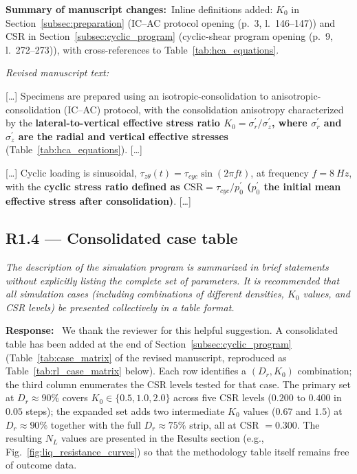 \documentclass[11pt,a4paper]{article}
\newenvironment{rcomment}
  {\begin{leftbar}\color{black!75}\itshape}
  {\end{leftbar}\vspace{0.3em}}
\newcommand{\response}{\par\noindent\textbf{Response:}\ \ignorespaces}
\newcommand{\changed}[1]{\par\noindent\textbf{Summary of manuscript changes:}\ #1\par}
\newenvironment{revtext}
  {\par\vspace{0.2em}\noindent\textit{Revised manuscript text:}\par
   \begingroup\color{black}\begin{leftbar}\small}
  {\end{leftbar}\endgroup\vspace{0.3em}}
\newcommand{\manref}[1]{(#1)}                  %
\newcommand{\Kzero}{\ensuremath{K_0}}
\begin{document}
\changed{Inline definitions added: $\Kzero$ in
Section~\ref{subsec:preparation} (IC--AC protocol opening
\manref{p.~3, l.~146--147}) and $\mathrm{CSR}$ in
Section~\ref{subsec:cyclic_program} (cyclic-shear program opening
\manref{p.~9, l.~272--273}), with cross-references to
Table~\ref{tab:hca_equations}.}

\begin{revtext}
[\ldots] Specimens are prepared using an isotropic-consolidation to
anisotropic-consolidation (IC--AC) protocol, with the consolidation
anisotropy characterized by the \textbf{lateral-to-vertical effective
stress ratio $\Kzero = \sigma_r^{\prime}/\sigma_z^{\prime}$, where
$\sigma_r^{\prime}$ and $\sigma_z^{\prime}$ are the radial and
vertical effective stresses} (Table~\ref{tab:hca_equations}). [\ldots]
\medskip

[\ldots] Cyclic loading is sinusoidal,
$\tau_{z\theta}(t) = \tau_{cyc}\sin(2\pi f t)$, at frequency
$f = \SI{8}{Hz}$, with the \textbf{cyclic stress ratio defined as
$\mathrm{CSR} = \tau_{cyc}/p_0^{\prime}$ ($p_0^{\prime}$ the initial
mean effective stress after consolidation)}. [\ldots]
\end{revtext}

\subsection*{R1.4 --- Consolidated case table}

\begin{rcomment}
The description of the simulation program is summarized in brief statements
without explicitly listing the complete set of parameters. It is recommended
that all simulation cases (including combinations of different densities,
$\Kzero$ values, and CSR levels) be presented collectively in a table
format.
\end{rcomment}

\response
We thank the reviewer for this helpful suggestion. A consolidated
table has been added at the end of
Section~\ref{subsec:cyclic_program} (Table~\ref{tab:case_matrix} of
the revised manuscript, reproduced as Table~\ref{tab:rl_case_matrix}
below). Each row identifies a $(D_r, \Kzero)$ combination; the
third column enumerates the CSR levels tested for that case. The
primary set at $D_r \approx 90\%$ covers
$\Kzero \in \{0.5, 1.0, 2.0\}$ across five CSR levels
($0.200$ to $0.400$ in $0.05$ steps); the expanded set adds two
intermediate $\Kzero$ values ($0.67$ and $1.5$) at $D_r \approx
90\%$ together with the full $D_r \approx 75\%$ strip, all at
CSR $= 0.300$. The resulting $N_L$ values are presented in the
Results section (e.g., Fig.~\ref{fig:liq_resistance_curves}) so
that the methodology table itself remains free of outcome data.
\end{document}
